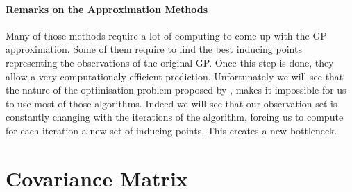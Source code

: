 \paragraph{Remarks on the Approximation Methods}
Many of those methods require a lot of computing to come up with the GP approximation. Some of them require to find the best inducing points representing the observations of the original GP. Once this step is done, they allow a very computationaly efficient prediction. Unfortunately we will see that the nature of the optimisation problem proposed by \citet{krause_near-optimal_2008}, makes it impossible for us to use most of those algorithms. Indeed we will see that our observation set is constantly changing with the iterations of the algorithm, forcing us to compute for each iteration a new set of inducing points. This creates a new bottleneck. 
%
%
%


\section{Covariance Matrix} \label{sec:cov_est}


